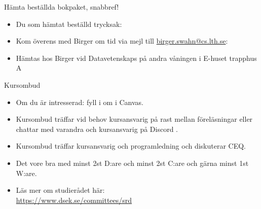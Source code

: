 
\ifkompendium\else
\begin{SlideExtra}{Hämta beställda bokpaket, snabbref!}
  \begin{itemize}
    \item Du som  hämtat beställd trycksak: 
    \item[] Kom överens med Birger om tid via mejl till \url{birger.swahn@cs.lth.se}: \\
    \item[] Hämtas hos Birger vid Datavetenskaps  på andra våningen i E-huset trapphus A
  \end{itemize}
\end{SlideExtra}


\begin{SlideExtra}{Kursombud}
\begin{itemize}
\item Om du är intresserad: fyll i  om  i Canvas.
\item Kursombud träffar vid behov kursansvarig på rast mellan föreläsningar eller chattar med varandra och kursansvarig på Discord .
\item Kursombud träffar kursansvarig och programledning  och diskuterar  CEQ.
\item Det vore bra med minst 2st D:are och minst 2st C:are och gärna minst 1st W:are.
\item Läs mer om studierådet här:\\{\SlideFontSmall\url{https://www.dsek.se/committees/srd}}
\end{itemize}
\end{SlideExtra}
\fi
